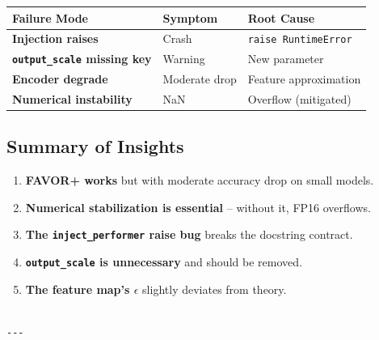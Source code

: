 \begin{table}[H]
\centering
\small
\begin{tabular}{lll}
\toprule
\textbf{Failure Mode} & \textbf{Symptom} & \textbf{Root Cause} \\
\midrule
\textbf{Injection raises} & Crash & \texttt{raise RuntimeError} \\
\textbf{\texttt{output\_scale} missing key} & Warning & New parameter \\
\textbf{Encoder degrade} & Moderate drop & Feature approximation \\
\textbf{Numerical instability} & NaN & Overflow (mitigated) \\
\bottomrule
\end{tabular}
\end{table}

\subsection{Summary of Insights}

\begin{enumerate}
\item \textbf{FAVOR+ works} but with moderate accuracy drop on small models.
\item \textbf{Numerical stabilization is essential} -- without it, FP16 overflows.
\item \textbf{The \texttt{inject\_performer} raise bug} breaks the docstring contract.
\item \textbf{\texttt{output\_scale} is unnecessary} and should be removed.
\item \textbf{The feature map's $\epsilon$} slightly deviates from theory.
\end{enumerate}
\begin{lstlisting}

---
\end{lstlisting}